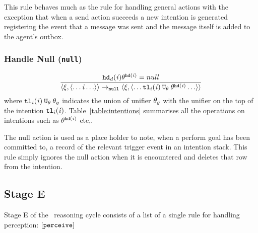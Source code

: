 This rule behaves much as the rule for handling general actions with the exception that when a send action succeeds a new intention is generated registering the event that a message was sent and the message itself is added to the agent's outbox.

\subsubsection*{Handle Null ({\tt null})}

\begin{equation}
\frac{
\mathit{{\tt hd}_d}(\mathit{i})\theta^{{\tt hd}(\mathit{i})}  =  null
}{\langle \xi, \langle \ldots  \mathit{i} \ldots \rangle \rangle \rightarrow_{\tt null}
\langle \xi, \langle \ldots {\tt tl}_i(\mathit{i}) \: {\tt U}_{\theta} \:
\theta^{{\tt hd}(\mathit{i})} \ldots \rangle \rangle
}
\end{equation}
where ${\tt tl}_i(\mathit{i}) \: {\tt U}_{\theta} \: \theta_g$ indicates the union of unifier $\theta_g$ with the unifier on the top of the intention ${\tt tl}_i(\mathit{i})$.
Table~\ref{table:intentions} summarises all the operations on intentions such as $\theta^{{\tt hd}(\mathit{i})}$ etc,.

The null action is used as a
place holder to note, when a perform goal has been committed to, a record of the relevant trigger event in
an intention stack.  This rule simply ignores the null action when it
is encountered and deletes that row from the intention.

\subsection{Stage E}

Stage E of the \gwendolen\ reasoning cycle consists of a list of a single rule for handling perception: $[ {\tt perceive} ]$

